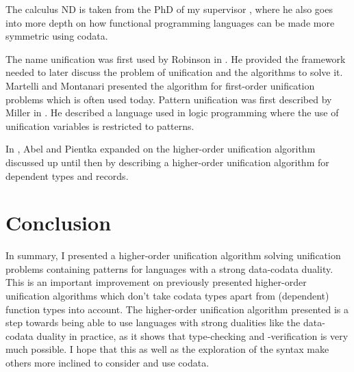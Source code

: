 \documentclass[twoside,12pt,a4paper]{article}
\begin{document}
The calculus ND is taken from the PhD of my supervisor \cite{binder2024programming}, 
where he also goes into more depth on how functional programming languages can be made more symmetric using codata.

The name unification was first used by Robinson in \cite{10.1145/321250.321253}. 
He provided the framework needed to later discuss the problem of unification and the algorithms to solve it.
Martelli and Montanari \cite{10.1145/357162.357169} presented the algorithm for first-order unification problems
which is often used today. 
Pattern unification was first described by Miller in \cite{10.1093/logcom/1.4.497}.
He described a language used in logic programming where the use of unification variables is restricted to patterns.

In \cite{10.5555/2021953.2021960}, Abel and Pientka expanded on the higher-order unification algorithm discussed up until then 
by describing a higher-order unification algorithm for dependent types and records.





\section{Conclusion}\label{sec:conclusion}
In summary, I presented a higher-order unification algorithm solving unification problems containing patterns 
for languages with a strong data-codata duality.
This is an important improvement on previously presented higher-order unification algorithms
which don't take codata types apart from (dependent) function types into account. 
The higher-order unification algorithm presented is a step towards 
being able to use languages with strong dualities like the data-codata duality in practice,
as it shows that type-checking and -verification is very much possible.
I hope that this as well as the exploration of the syntax make others more inclined to consider and use codata.

\end{document}
